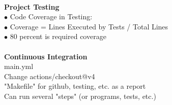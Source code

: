 \documentclass[11pt]{article}
\begin{document}
\\
\textbf{Project Testing}\\
\indent $\bullet$ Code Coverage in Testing:\\
\indent $\bullet$ Coverage = Lines Executed by Tests / Total Lines\\
\indent $\bullet$ 80 percent is required coverage \\
\\
\textbf{Continuous Integration}\\
\indent main.yml\\
\indent Change actions/checkout@v4\\
\indent "Makefile" for github, testing, etc. as a report\\
\indent Can run several "steps" (or programs, tests, etc.)\\
\end{document}
